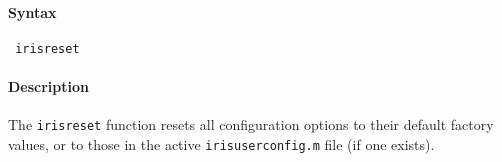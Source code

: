 


	\paragraph{Syntax}
 
 \begin{verbatim}
 irisreset
 \end{verbatim}
 
 \paragraph{Description}
 
 The \texttt{irisreset} function resets all configuration options to
 their default factory values, or to those in the active
 \texttt{irisuserconfig.m} file (if one exists).


